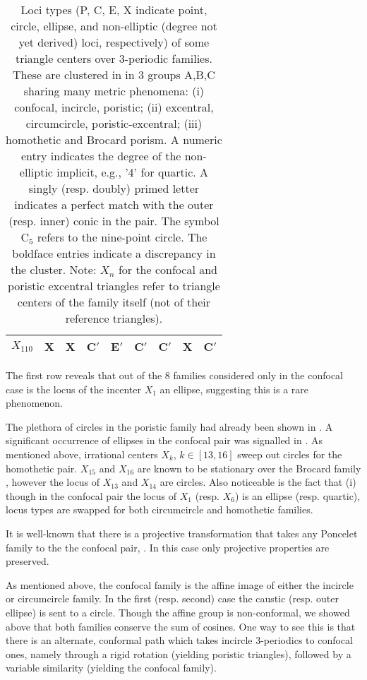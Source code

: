 \begin{table}
\begin{tabular}{|c||c|c|c||c|c|c||c|c||}
$X_{110}$ & X & X & C$'$ & E$'$&C$'$ & C$'$ & \textbf{X} & C$'$ \\
 \hline
\end{tabular}
\caption{Loci types (P, C, E, X indicate point, circle, ellipse, and non-elliptic (degree not yet derived) loci, respectively) of some triangle centers over 3-periodic families. These are clustered in in 3 groups A,B,C sharing many metric phenomena: (i) confocal, incircle, poristic; (ii) excentral, circumcircle, poristic-excentral; (iii) homothetic and Brocard porism. A numeric entry indicates the degree of the non-elliptic implicit, e.g., '4' for quartic. A singly (resp. doubly) primed letter indicates a perfect match with the outer (resp. inner) conic in the pair. The symbol C$_5$ refers to the nine-point circle. The boldface entries indicate a discrepancy in the cluster. Note: $X_n$ for the confocal and poristic excentral triangles refer to triangle centers of the family itself (not of their reference triangles).}
\label{tab:04-xn-comparison}
\end{table}

The first row reveals that out of the 8 families considered only in the confocal case is the locus of the incenter $X_1$ an ellipse, suggesting this is a rare phenomenon.

The plethora of circles in the poristic family had already been shown in \cite{odehnal2011-poristic}. A significant occurrence of ellipses in the confocal pair was signalled in \cite{garcia2020-ellipses}. As mentioned above, irrational centers $X_k$, $k\in[13,16]$ sweep out circles for the homothetic pair. $X_{15}$ and $X_{16}$ are known to be stationary over the Brocard family \cite{bradley2007-brocard}, however the locus of $X_{13}$ and $X_{14}$ are circles. Also noticeable is the fact that (i) though in the confocal pair the locus of $X_1$ (resp. $X_6$) is an ellipse (resp. quartic), locus types are swapped for both circumcircle and homothetic families.

It is well-known that there is a projective transformation that takes any Poncelet family to the the confocal pair,  \cite{dragovic11}. In this case only projective properties are preserved.

As mentioned above, the confocal family is the affine image of either the incircle or circumcircle family. In the first (resp. second) case the caustic (resp. outer ellipse) is sent to a circle. Though the affine group is non-conformal, we showed above that both families conserve the sum of cosines. One way to see this is that there is an alternate, conformal path which takes incircle 3-periodics to confocal ones, namely through a rigid rotation (yielding poristic triangles), followed by a variable similarity (yielding the confocal family).

